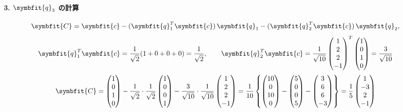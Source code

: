     \paragraph{3. $\symbfit{q}_3$ の計算}
    \[
        \symbfit{C} = \symbfit{c} - (\symbfit{q}_1^T \symbfit{c})\,\symbfit{q}_1 - (\symbfit{q}_2^T \symbfit{c})\,\symbfit{q}_2,
    \]
    \[
        \symbfit{q}_1^T \symbfit{c} = \frac{1}{\sqrt2}(1+0+0+0)=\frac{1}{\sqrt{2}},\qquad
        \symbfit{q}_2^T \symbfit{c}
        = \frac{1}{\sqrt{10}}\begin{pmatrix} 1 \\ 2 \\ 2 \\ -1 \end{pmatrix}^T \begin{pmatrix} 1 \\ 0 \\ 1 \\ 0 \end{pmatrix}
        = \frac{3}{\sqrt{10}}
    \]
    \[
        \symbfit{C}
        = \begin{pmatrix} 1 \\ 0 \\ 1 \\ 0\end{pmatrix}
        - \frac{1}{\sqrt{2}} \cdot\frac{1}{\sqrt{2}}\begin{pmatrix} 1 \\ 0 \\ 0 \\ 1 \end{pmatrix}
        - \frac{3}{\sqrt{10}} \cdot\frac{1}{\sqrt{10}} \begin{pmatrix} 1 \\ 2 \\ 2 \\ -1 \end{pmatrix}
        =\frac{1}{10}\left\{
            \begin{pmatrix} 10 \\ 0 \\ 10 \\ 0 \end{pmatrix}
            - \begin{pmatrix} 5 \\ 0 \\ 0 \\ 5 \end{pmatrix}
            - \begin{pmatrix} 3 \\ 6 \\ 6 \\ -3 \end{pmatrix}
        \right\}
        =\frac{1}{5}\begin{pmatrix}
            1 \\ -3 \\ 2 \\ -1
        \end{pmatrix}
    \]
